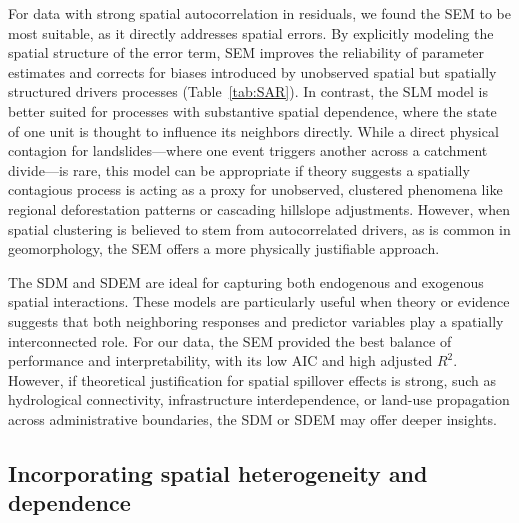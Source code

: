 \documentclass[lineno,pdflatex,sn-basic]{sn-jnl}%
\theoremstyle{thmstyleone}%
\theoremstyle{thmstyletwo}%
\theoremstyle{thmstylethree}%
\begin{document}
For data with strong spatial autocorrelation in residuals, we found the SEM to be most suitable, as it directly addresses spatial errors.
By explicitly modeling the spatial structure of the error term, SEM improves the reliability of parameter estimates and corrects for biases introduced by unobserved spatial but spatially structured drivers processes (Table~\ref{tab:SAR}). 
In contrast, the SLM model is better suited for processes with substantive spatial dependence, where the state of one unit is thought to influence its neighbors directly. 
While a direct physical contagion for landslides—where one event triggers another across a catchment divide—is rare, this model can be appropriate if theory suggests a spatially contagious process is acting as a proxy for unobserved, clustered phenomena like regional deforestation patterns or cascading hillslope adjustments. 
However, when spatial clustering is believed to stem from autocorrelated drivers, as is common in geomorphology, the SEM offers a more physically justifiable approach.

The SDM and SDEM are ideal for capturing both endogenous and exogenous spatial interactions.
These models are particularly useful when theory or evidence suggests that both neighboring responses and predictor variables play a spatially interconnected role. 
For our data, the SEM provided the best balance of performance and interpretability, with its low AIC and high adjusted $R^2$. 
However, if theoretical justification for spatial spillover effects is strong, such as hydrological connectivity, infrastructure interdependence, or land-use propagation across administrative boundaries, the SDM or SDEM may offer deeper insights. 

\subsection{Incorporating spatial heterogeneity and dependence}
\end{document}
